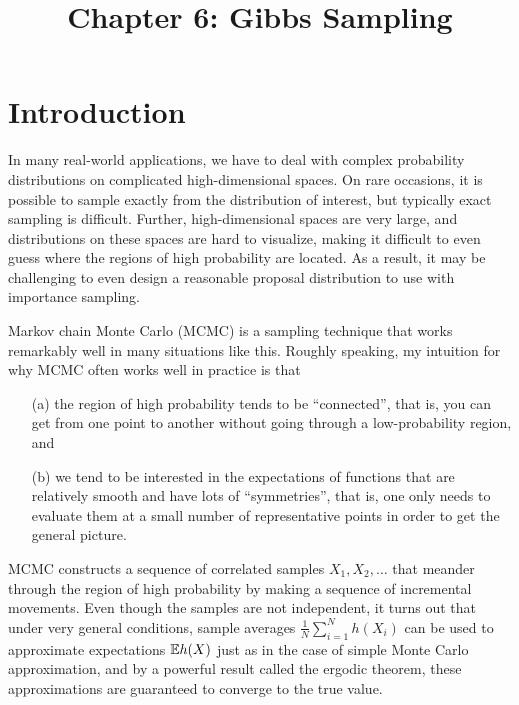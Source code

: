 \documentclass[12pt]{article}
\title{Chapter 6: Gibbs Sampling}
\author{}
\date{}
\begin{document}
\maketitle

\thispagestyle{firststyle}

\tableofcontents 

\vspace{5em}

\section{Introduction}

In many real-world applications, we have to deal with complex probability distributions on complicated high-dimensional spaces. On rare occasions, it is possible to sample exactly from the distribution of interest, but typically exact sampling is difficult. Further, high-dimensional spaces are very large, and distributions on these spaces are hard to visualize, making it difficult to even guess where the regions of high probability are located. As a result, it may be challenging to even design a reasonable proposal distribution to use with importance sampling.

Markov chain Monte Carlo (MCMC) is a sampling technique that works remarkably well in many situations like this. Roughly speaking, my intuition for why MCMC often works well in practice is that
\begin{itemize}
\item[(a)] the region of high probability tends to be ``connected'', that is, you can get from one point to another without going through a low-probability region, and
\item[(b)] we tend to be interested in the expectations of functions that are relatively smooth and have lots of ``symmetries'', that is, one only needs to evaluate them at a small number of representative points in order to get the general picture.
\end{itemize}

MCMC constructs a sequence of correlated samples $X_1,X_2,\dotsc$ that meander through the region of high probability by making a sequence of incremental movements. Even though the samples are not independent, it turns out that under very general conditions, sample averages $\frac{1}{N}\sum_{i = 1}^N h(X_i)$ can be used to approximate expectations $\mathbb{E} h(X)$ just as in the case of simple Monte Carlo approximation, and by a powerful result called the ergodic theorem, these approximations are guaranteed to converge to the true value.
\end{document}
